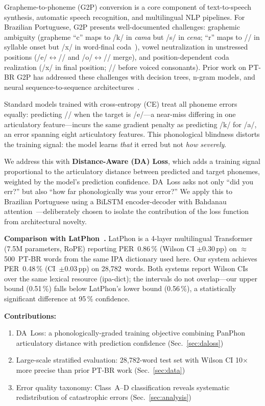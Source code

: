\documentclass[conference]{IEEEtran}
\begin{document}
Grapheme-to-phoneme (G2P) conversion is a core component of
text-to-speech synthesis, automatic speech recognition, and
multilingual NLP pipelines.
For Brazilian Portuguese, G2P presents well-documented challenges:
graphemic ambiguity (grapheme ``c'' maps to /k/ in \textit{cama}
but /s/ in \textit{cena}; ``r'' maps to // in syllable
onset but /x/ in word-final coda~\cite{barbosa2004brazilian}), vowel
neutralization in unstressed positions
(/e/$\leftrightarrow$// and /o/$\leftrightarrow$//
merge), and position-dependent coda realization (/x/ in final
position; // before voiced consonants).
Prior work on PT-BR G2P has addressed these challenges with
decision trees, n-gram models, and neural sequence-to-sequence
architectures~\cite{neto2006brazilian}.

Standard models trained with cross-entropy (CE) treat all phoneme
errors equally: predicting // when the target is /e/---a
near-miss differing in one articulatory feature---incurs the same
gradient penalty as predicting /k/ for /a/, an error spanning eight
articulatory features.
This phonological blindness distorts the training signal: the model
learns \emph{that} it erred but not \emph{how severely}.

We address this with \textbf{Distance-Aware (DA) Loss}, which adds a
training signal proportional to the articulatory distance between
predicted and target phonemes, weighted by the model's prediction
confidence.
DA~Loss asks not only ``did you err?'' but also ``how far
phonologically was your error?''
We apply this to Brazilian Portuguese using a BiLSTM encoder-decoder
with Bahdanau attention~\cite{bahdanau2014neural}---deliberately
chosen to isolate the contribution of the loss function from
architectural novelty.

\textbf{Comparison with LatPhon~\cite{chary2025latphon}.}
LatPhon is a 4-layer multilingual Transformer (7.5M parameters, RoPE)
reporting PER~0.86\,\% (Wilson CI $\pm$0.30\,pp) on
$\approx$500~PT-BR words from the same IPA dictionary used here.
Our system achieves PER~0.48\,\% (CI~$\pm$0.03\,pp) on
28{,}782~words.
Both systems report Wilson CIs over the same lexical resource
(ipa-dict); the intervals do not overlap---our upper bound
(0.51\,\%) falls below LatPhon's lower bound (0.56\,\%),
a statistically significant difference at 95\,\% confidence.

\textbf{Contributions:}
\begin{enumerate}
  \item DA~Loss: a phonologically-graded training objective combining
        PanPhon articulatory distance with prediction confidence
        (Sec.~\ref{sec:daloss})
  \item Large-scale stratified evaluation: 28{,}782-word test set
        with Wilson CI 10$\times$ more precise than prior PT-BR work
        (Sec.~\ref{sec:data})
  \item Error quality taxonomy: Class~A--D classification reveals
        systematic redistribution of catastrophic errors
        (Sec.~\ref{sec:analysis})
\end{enumerate}
\end{document}
